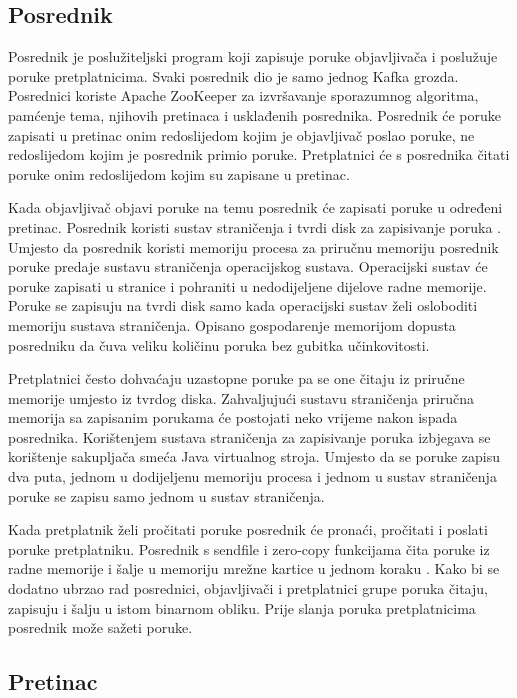 \documentclass[utf8, diplomski, lmodern, numeric]{fer}
\begin{document}
\subsection{Posrednik}
Posrednik je poslužiteljski program koji zapisuje poruke objavljivača i poslužuje poruke pretplatnicima. Svaki posrednik dio je samo jednog Kafka grozda. Posrednici koriste Apache ZooKeeper za izvršavanje sporazumnog algoritma, pamćenje tema, njihovih pretinaca i usklađenih posrednika. Posrednik će poruke zapisati u pretinac onim redoslijedom kojim je objavljivač poslao poruke, ne redoslijedom kojim je posrednik primio poruke. Pretplatnici će s posrednika čitati poruke onim redoslijedom kojim su zapisane u pretinac.

Kada objavljivač objavi poruke na temu posrednik će zapisati poruke u određeni pretinac. Posrednik koristi sustav straničenja i tvrdi disk za zapisivanje poruka \citep{kafka-paging}. Umjesto da posrednik koristi memoriju procesa za priručnu memoriju posrednik poruke predaje sustavu straničenja operacijskog sustava. Operacijski sustav će poruke zapisati u stranice i pohraniti u nedodijeljene dijelove radne memorije. Poruke se zapisuju na tvrdi disk samo kada operacijski sustav želi osloboditi memoriju sustava straničenja. Opisano gospodarenje memorijom dopusta posredniku da čuva veliku količinu poruka bez gubitka učinkovitosti.

Pretplatnici često dohvaćaju uzastopne poruke pa se one čitaju iz priručne memorije umjesto iz tvrdog diska. Zahvaljujući sustavu straničenja priručna memorija sa zapisanim porukama će postojati neko vrijeme nakon ispada posrednika. Korištenjem sustava straničenja za zapisivanje poruka izbjegava se korištenje sakupljača smeća Java virtualnog stroja. Umjesto da se poruke zapisu dva puta, jednom u dodijeljenu memoriju procesa i jednom u sustav straničenja poruke se zapisu samo jednom u sustav straničenja.

Kada pretplatnik želi pročitati poruke posrednik će pronaći, pročitati i poslati poruke pretplatniku. Posrednik s sendfile i zero-copy funkcijama čita poruke iz radne memorije i šalje u memoriju mrežne kartice u jednom koraku \citep{linux-sendfile} \citep{java-zero-copy}. Kako bi se dodatno ubrzao rad posrednici, objavljivači i pretplatnici grupe poruka čitaju, zapisuju i šalju u istom binarnom obliku. Prije slanja poruka pretplatnicima posrednik može sažeti poruke.

\subsection{Pretinac}
\end{document}
